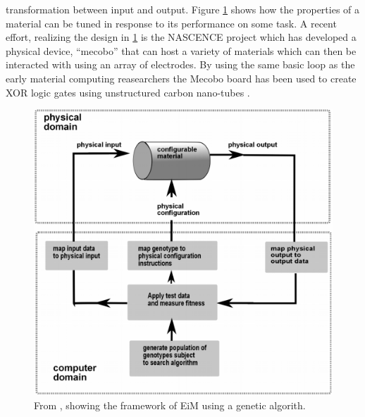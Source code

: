 transformation between input and output.
Figure \ref{figEiM} shows how the properties of a material can be tuned in
response to its performance on some task.
A recent effort, realizing the design in \ref{figEiM} is the NASCENCE project
which has developed a physical device, ``mecobo'' that can host a variety of
materials which can then be interacted with using an array of electrodes.
%
By using the same basic loop as the early material computing reasearchers the
Mecobo board has been used to create XOR logic gates using unstructured carbon
nano-tubes \cite{lykkebo_mecobo:_2014}.
%
\begin{figure}[h]
  \centering
  \includegraphics[width=1\textwidth]{fig/GunnarEiM.png}
  \caption{
    From \cite{tufteEiMpaper}, showing the framework of EiM using a genetic
    algorith.
  }
  \label{figEiM}
\end{figure}
